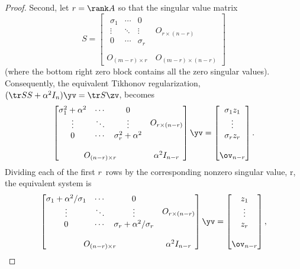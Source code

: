 \begin{proof}
Second, let \(r=\rank A\) so that the singular value matrix
\begin{equation*}
S=\begin{bmatrix} \begin{matrix} \sigma_1&\cdots&0\\
\vdots&\ddots&\vdots\\
0&\cdots&\sigma_r \end{matrix} & 
O_{r\times (n-r)}\\\,\\
O_{(m-r)\times r}&O_{(m-r)\times (n-r)}\end{bmatrix}
\end{equation*}
(where the bottom right zero block contains all the zero singular values).
Consequently, the equivalent Tikhonov regularization, \((\tr SS+\alpha^2I_n)\yv=\tr S\zv\), becomes
\begin{equation*}
\begin{bmatrix} \begin{matrix} \sigma_1^2+\alpha^2&\cdots&0\\
\vdots&\ddots&\vdots\\
0&\cdots&\sigma_r^2+\alpha^2 \end{matrix} & 
O_{r\times (n-r)}\\\,\\
O_{(n-r)\times r}&\alpha^2I_{n-r}\end{bmatrix}\yv
=\begin{bmatrix} \sigma_1z_1\\\vdots\\\sigma_rz_r\\\,\\\ov_{n-r} \end{bmatrix}.
\end{equation*}
Dividing each of the first \(r\)~rows by the corresponding nonzero singular value, \hlist\sigma r, the equivalent system is
\begin{equation*}
\begin{bmatrix} \begin{matrix} \sigma_1+\alpha^2/\sigma_1&\cdots&0\\
\vdots&\ddots&\vdots\\
0&\cdots&\sigma_r+\alpha^2/\sigma_r \end{matrix} & 
O_{r\times (n-r)}\\\,\\
O_{(n-r)\times r}&\alpha^2I_{n-r}\end{bmatrix}\yv
=\begin{bmatrix} z_1\\\vdots\\z_r\\\,\\\ov_{n-r} \end{bmatrix},

\end{equation*}
\end{proof}
